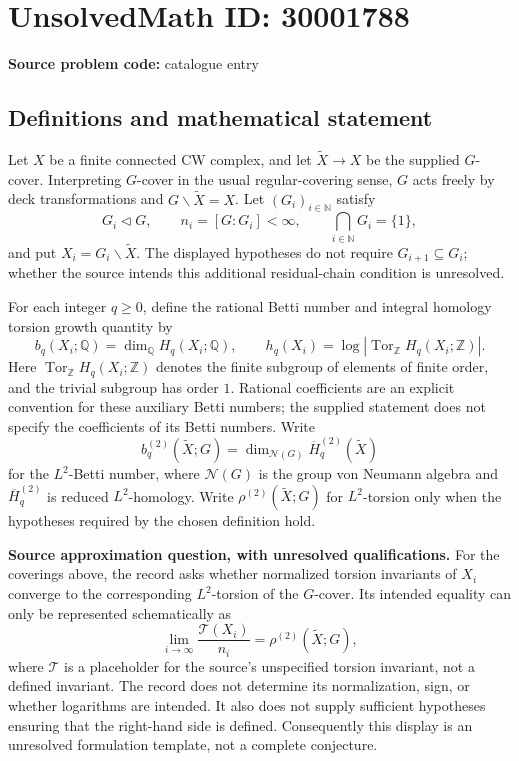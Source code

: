 \documentclass[11pt]{article}
\newcommand{\N}{\mathbb{N}}
\newcommand{\Z}{\mathbb{Z}}
\newcommand{\Q}{\mathbb{Q}}
\begin{document}
\section*{UnsolvedMath ID: 30001788}
\textbf{Source problem code:} catalogue entry
\subsection{Definitions and mathematical statement}
Let \(X\) be a finite connected CW complex, and let \(\widetilde X\to X\) be the supplied \(G\)-cover. Interpreting \(G\)-cover in the usual regular-covering sense, \(G\) acts freely by deck transformations and \(G\backslash\widetilde X=X\). Let \((G_i)_{i\in\N}\) satisfy
\[
G_i\triangleleft G,\qquad n_i=[G:G_i]<\infty,\qquad \bigcap_{i\in\N}G_i=\{1\},
\]
and put \(X_i=G_i\backslash\widetilde X\). The displayed hypotheses do not require \(G_{i+1}\subseteq G_i\); whether the source intends this additional residual-chain condition is unresolved.

For each integer \(q\geq0\), define the rational Betti number and integral homology torsion growth quantity by
\[
b_q(X_i;\Q)=\dim_{\Q}H_q(X_i;\Q),\qquad
h_q(X_i)=\log\left|\operatorname{Tor}_{\Z}H_q(X_i;\Z)\right|.
\]
Here \(\operatorname{Tor}_{\Z}H_q(X_i;\Z)\) denotes the finite subgroup of elements of finite order, and the trivial subgroup has order \(1\). Rational coefficients are an explicit convention for these auxiliary Betti numbers; the supplied statement does not specify the coefficients of its Betti numbers. Write
\[
b_q^{(2)}(\widetilde X;G)
=\dim_{\mathcal N(G)}\overline H_q^{(2)}(\widetilde X)
\]
for the \(L^2\)-Betti number, where \(\mathcal N(G)\) is the group von Neumann algebra and \(\overline H_q^{(2)}\) is reduced \(L^2\)-homology. Write \(\rho^{(2)}(\widetilde X;G)\) for \(L^2\)-torsion only when the hypotheses required by the chosen definition hold.

\textbf{Source approximation question, with unresolved qualifications.} For the coverings above, the record asks whether normalized torsion invariants of \(X_i\) converge to the corresponding \(L^2\)-torsion of the \(G\)-cover. Its intended equality can only be represented schematically as
\[
\lim_{i\to\infty}\frac{\mathcal T(X_i)}{n_i}
=\rho^{(2)}(\widetilde X;G),
\]
where \(\mathcal T\) is a placeholder for the source's unspecified torsion invariant, not a defined invariant. The record does not determine its normalization, sign, or whether logarithms are intended. It also does not supply sufficient hypotheses ensuring that the right-hand side is defined. Consequently this display is an unresolved formulation template, not a complete conjecture.
\end{document}
